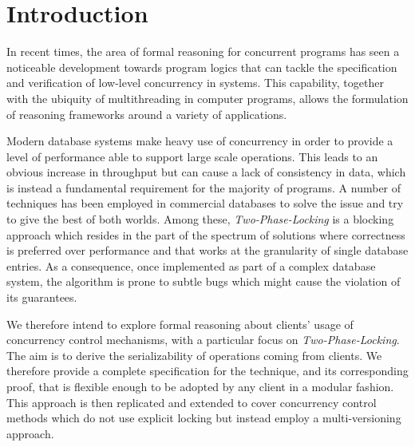 \section{Introduction}

In recent times, the area of formal reasoning for concurrent programs has seen a noticeable development towards program logics that can tackle the specification and verification of low-level concurrency in systems. This capability, together with the ubiquity of multithreading in computer programs, allows the formulation of reasoning frameworks around a variety of applications.

Modern database systems make heavy use of concurrency in order to provide a level of performance able to support large scale operations. This leads to an obvious increase in throughput but can cause a lack of consistency in data, which is instead a fundamental requirement for the majority of programs. A number of techniques has been employed in commercial databases to solve the issue and try to give the best of both worlds. Among these, \textit{Two-Phase-Locking} is a blocking approach which resides in the part of the spectrum of solutions where correctness is preferred over performance and that works at the granularity of single database entries. As a consequence, once implemented as part of a complex database system, the algorithm is prone to subtle bugs which might cause the violation of its guarantees.

We therefore intend to explore formal reasoning about clients' usage of concurrency control mechanisms, with a particular focus on \textit{Two-Phase-Locking}. The aim is to derive the serializability of operations coming from clients. We therefore provide a complete specification for the technique, and its corresponding proof, that is flexible enough to be adopted by any client in a modular fashion. This approach is then replicated and extended to cover concurrency control methods which do not use explicit locking but instead employ a multi-versioning approach.